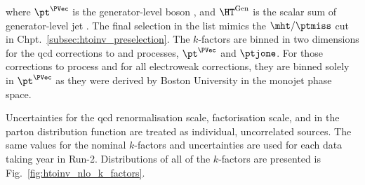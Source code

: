 \medskip

\noindent{}where $\pt^{\PVec}$ is the generator-level boson \pt, and $\HT^{\mathrm{Gen}}$ is the scalar sum of generator-level \gls{jet} \pt. The final selection in the list mimics the $\mht/\ptmiss$ cut in Chpt.~\ref{subsec:htoinv_preselection}. The $k$-factors are binned in two dimensions for the \acrshort{qcd} corrections to \PW and \PZ processes, $\pt^{\PVec}$ and $\ptjone$. For those corrections to \Pphoton process and for all electroweak corrections, they are binned solely in $\pt^{\PVec}$ as they were derived by Boston University in the monojet phase space.

Uncertainties for the \acrshort{qcd} renormalisation scale, factorisation scale, and in the parton distribution function are treated as individual, uncorrelated sources. The same values for the nominal $k$-factors and uncertainties are used for each data taking year in Run-2. Distributions of all of the $k$-factors are presented is Fig.~\ref{fig:htoinv_nlo_k_factors}.

